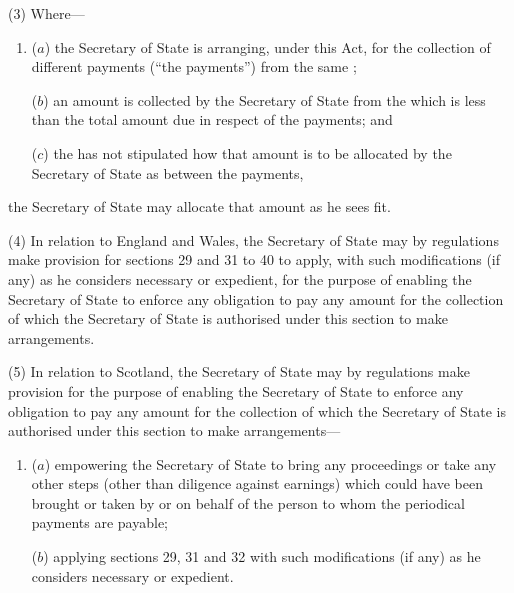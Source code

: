 \documentclass[a4paper]{article}
\begin{document}
(3) Where---
\begin{enumerate}\item[]
($a$) the Secretary of State is arranging, under this Act, for the collection of different payments (“the payments”) from the same ;

($b$) an amount is collected by the Secretary of State from the  which is less than the total amount due in respect of the payments; and

($c$) the  has not stipulated how that amount
is to be allocated by the Secretary of State as between the payments, 
\end{enumerate}
the Secretary of State may allocate that amount as he sees fit.

(4)
In relation to England and Wales, the Secretary of State may by regulations make provision for sections 29 and 31 to 40 to apply, with such modifications (if any) as he considers necessary or expedient, for the purpose of enabling the Secretary of State to enforce any obligation to pay any amount for the collection of which the Secretary of State is authorised under this section to make arrangements.

(5)
In relation to Scotland, the Secretary of State may by regulations make provision for the purpose of enabling the Secretary of State to enforce any obligation to pay any amount for the collection of which the Secretary of State is authorised under this section to make arrangements---
\begin{enumerate}\item[]
($a$) empowering the Secretary of State to bring any proceedings or take any other steps (other than diligence against earnings) which could have been brought or taken by or on behalf of the person to whom the periodical payments are payable;

($b$) applying sections 29, 31 and 32 with such modifications (if any) as he considers necessary or expedient.
\end{enumerate}

\end{document}

